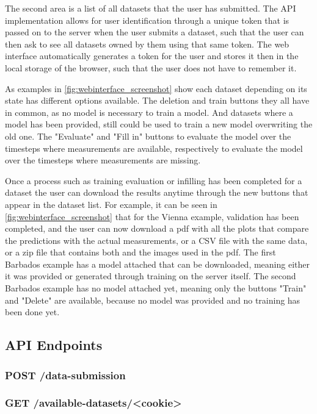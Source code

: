 The second area is a list of all datasets that the user has submitted. The API implementation allows for user identification through a unique token that is passed on to the server when the user submits a dataset, such that the user can then ask to see all datasets owned by them using that same token. The web interface automatically generates a token for the user and stores it then in the local storage of the browser, such that the user does not have to remember it.

As examples in \autoref{fig:webinterface_screenshot} show each dataset depending on its state has different options available. The deletion and train buttons they all have in common, as no model is necessary to train a model. And datasets where a model has been provided, still could be used to train a new model overwriting the old one. The "Evaluate" and "Fill in" buttons to evaluate the model over the timesteps where measurements are available, respectively to evaluate the model over the timesteps where measurements are missing.

Once a process such as training evaluation or infilling has been completed for a dataset the user can download the results anytime through the new buttons that appear in the dataset list. For example, it can be seen in \autoref{fig:webinterface_screenshot} that for the Vienna example, validation has been completed, and the user can now download a pdf with all the plots that compare the predictions with the actual measurements, or a CSV file with the same data, or a zip file that contains both and the images used in the pdf. The first Barbados example has a model attached that can be downloaded, meaning either it was provided or generated through training on the server itself. The second Barbados example has no model attached yet, meaning only the buttons "Train" and "Delete" are available, because no model was provided and no training has been done yet. 


\subsection{API Endpoints}
\label{sec:api}

\subsubsection*{POST /data-submission}

\subsubsection*{GET /available-datasets/<cookie>}

